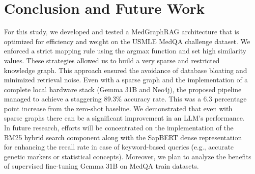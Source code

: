 \documentclass[a4paper,fleqn]{cas-sc}
\begin{document}
\section{Conclusion and Future Work}

For this study, we developed and tested a MedGraphRAG architecture that is optimized for efficiency and weight on the USMLE MedQA challenge dataset. We enforced a strict mapping rule using the argmax function and set high similarity values. These strategies allowed us to build a very sparse and restricted knowledge graph. This approach ensured the avoidance of database bloating and minimized retrieval noise. Even with a sparse graph and the implementation of a complete local hardware stack (Gemma 31B and Neo4j), the proposed pipeline managed to achieve a staggering 89.3\% accuracy rate. This was a 6.3 percentage point increase from the zero-shot baseline. We demonstrated that even with sparse graphs there can be a significant improvement in an LLM's performance.\\
     In future research, efforts will be concentrated on the implementation of the BM25 \cite{robertson1994bm25} hybrid search component along with the SapBERT dense representation for enhancing the recall rate in case of keyword-based queries (e.g., accurate genetic markers or statistical concepts). Moreover, we plan to analyze the benefits of supervised fine-tuning Gemma 31B on MedQA train datasets.



\end{document}
